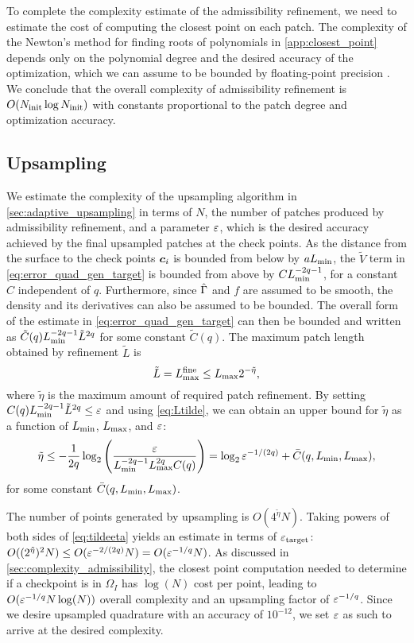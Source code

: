 To complete the complexity estimate of the admissibility refinement, we need to estimate the cost of computing the closest point on each patch.
The complexity of the Newton's method for finding roots of polynomials  in \cref{app:closest_point} depends only on the polynomial degree and the desired accuracy of the optimization, which we can assume to be bounded by floating-point precision \cite{schleicher2017newton}.
We conclude that the overall complexity of admissibility refinement is $O( N_{\mathrm{init}} \log N_{\mathrm{init}})$ with constants proportional to the patch degree and optimization accuracy.

\subsection{Upsampling\label{sec:complexity_upsampling}}
We estimate the complexity of the upsampling algorithm in \cref{sec:adaptive_upsampling} in terms of $N$, the number of patches produced by admissibility refinement, and a parameter $\varepsilon$, which is the desired accuracy achieved by the final upsampled patches at the check points.
As the distance from the surface to the check points ${\bm{c}}_i$ is bounded from below by
$a L_{\mathrm{min}}$,  the $\tilde{V}$ term 
in \cref{eq:error_quad_gen_target} is bounded from above by $C L_{\mathrm{min}}^{-2q-1}$, for a constant $C$ independent of $q$. 
Furthermore, since $\hat{\Gamma}$ and $f$ are assumed to be smooth, the density and its derivatives can also be assumed to be bounded.
The overall form of the estimate in \cref{eq:error_quad_gen_target} can then be bounded and written as $\tilde{C}(q) L_{\mathrm{min}}^{-2q-1} \tilde{L}^{2q}$ for some constant $\tilde{C}(q)$. 
The maximum patch length obtained by refinement $\tilde{L}$ is 
\begin{equation}
  \tilde{L} = L_{\mathrm{max}}^{\mathrm{fine}} \leq L_{\mathrm{max}} 2^{-\tilde{\eta}},
  \label{eq:Ltilde}
\end{equation}
where $\tilde{\eta}$ is the maximum amount of required patch refinement.
By setting $C(q) L_{\mathrm{min}}^{-2q-1} \tilde{L}^{2q} \leq \varepsilon$ and using \cref{eq:Ltilde}, we can 
obtain an upper bound for $\tilde{\eta}$ as a function of $L_{\mathrm{min}}$, $L_{\mathrm{max}}$, and $\varepsilon$:
\begin{equation}
  \tilde{\eta} \leq -\frac{1}{2q}\log_2 \left( \frac{\varepsilon}{L_{\mathrm{min}}^{-2q-1} L_{\mathrm{max}}^{2q} C(q)}\right)= \log_2 \varepsilon^{-1/(2q)} + \bar{C}(q,L_{\mathrm{min}},L_{\mathrm{max}}),
  \label{eq:tildeeta}
\end{equation}
for some constant $\bar{C}(q,L_{\mathrm{min}},L_{\mathrm{max}})$.

The number of points generated by upsampling is $O(4^{\tilde{\eta}} N )$.
Taking powers of both sides of \cref{eq:tildeeta} yields an
estimate in terms of ${\varepsilon_{\mathrm{target}}}$:  $O( (2^{\tilde{\eta}})^2N ) \leq O(\varepsilon^{-2/(2q)}N ) =  O(\varepsilon^{-1/q}N )$. 
As discussed in \cref{sec:complexity_admissibility}, the closest point computation needed to determine if a checkpoint is in $\Omega_I$ has $\log (N)$ cost per point, leading to $O(\varepsilon^{-1/q} N \log(N))$ overall complexity and an upsampling factor of $\varepsilon^{-1/q}$. 
Since we desire upsampled quadrature with an accuracy of $10^{-12}$, we set $\varepsilon$ as such to arrive at the desired complexity.


